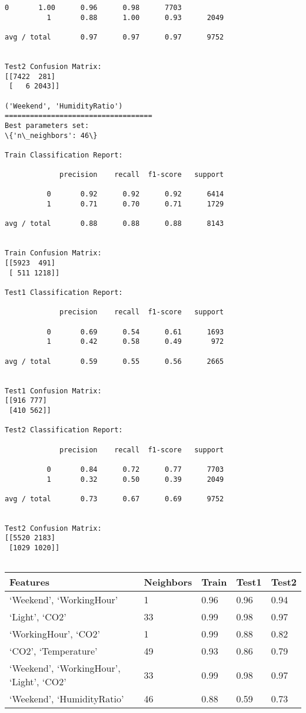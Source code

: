 \documentclass[11pt]{article}
\begin{document}
\begin{Verbatim}[commandchars=\\\{\}]
          0       1.00      0.96      0.98      7703
          1       0.88      1.00      0.93      2049

avg / total       0.97      0.97      0.97      9752


Test2 Confusion Matrix:
[[7422  281]
 [   6 2043]]

('Weekend', 'HumidityRatio')
===================================
Best parameters set:
\{'n\_neighbors': 46\}

Train Classification Report:

             precision    recall  f1-score   support

          0       0.92      0.92      0.92      6414
          1       0.71      0.70      0.71      1729

avg / total       0.88      0.88      0.88      8143


Train Confusion Matrix:
[[5923  491]
 [ 511 1218]]

Test1 Classification Report:

             precision    recall  f1-score   support

          0       0.69      0.54      0.61      1693
          1       0.42      0.58      0.49       972

avg / total       0.59      0.55      0.56      2665


Test1 Confusion Matrix:
[[916 777]
 [410 562]]

Test2 Classification Report:

             precision    recall  f1-score   support

          0       0.84      0.72      0.77      7703
          1       0.32      0.50      0.39      2049

avg / total       0.73      0.67      0.69      9752


Test2 Confusion Matrix:
[[5520 2183]
 [1029 1020]]


    \end{Verbatim}

    \begin{longtable}[]{@{}lllll@{}}
\toprule
Features & Neighbors & Train & Test1 & Test2\tabularnewline
\midrule
\endhead
`Weekend', `WorkingHour' & 1 & 0.96 & 0.96 & 0.94\tabularnewline
`Light', `CO2' & 33 & 0.99 & 0.98 & 0.97\tabularnewline
`WorkingHour', `CO2' & 1 & 0.99 & 0.88 & 0.82\tabularnewline
`CO2', `Temperature' & 49 & 0.93 & 0.86 & 0.79\tabularnewline
`Weekend', `WorkingHour', `Light', `CO2' & 33 & 0.99 & 0.98 &
0.97\tabularnewline
`Weekend', `HumidityRatio' & 46 & 0.88 & 0.59 & 0.73\tabularnewline
\bottomrule
\end{longtable}
\end{document}
